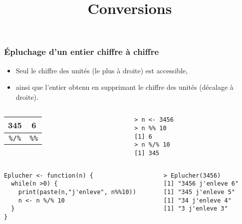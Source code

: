 \documentclass[10pt]{beamer}
\title{Conversions}
\begin{document}
\maketitle



\begin{frame}[fragile]
  \frametitle{Épluchage d'un entier chiffre à chiffre}

  \begin{itemize}
  \item Seul le chiffre des unités (le plus à droite) est accessible, 
  \item ainsi que l'entier obtenu en supprimant le chiffre des unités (décalage à droite).
  \end{itemize}
 
  \begin{columns}[c]
    \begin{column}{0.6\textwidth}
      \begin{center}
  \begin{tabular}{c|c}
    \toprule
    345 & 6 \\
    \midrule
    \texttt{\%/\%} &     \texttt{\%\%} \\
    \bottomrule
  \end{tabular}
\end{center}  
\end{column}
\begin{column}{0.4\textwidth}
  \begin{lstlisting}
> n <- 3456
> n %% 10
[1] 6
> n %/% 10
[1] 345
\end{lstlisting}
\end{column}
\end{columns}



\begin{columns}[t]
\begin{column}{0.62\textwidth}
\begin{lstlisting}[style=editor]
Eplucher <- function(n) {
  while(n >0) {
    print(paste(n,"j'enleve", n%%10))
    n <- n %/% 10
  }
}  
\end{lstlisting}
\end{column}
\begin{column}{0.38\textwidth}
\begin{lstlisting}
> Eplucher(3456)
[1] "3456 j'enleve 6"
[1] "345 j'enleve 5"
[1] "34 j'enleve 4"
[1] "3 j'enleve 3"  
\end{lstlisting}
\end{column}
\end{columns}

\end{frame}
\end{document}
